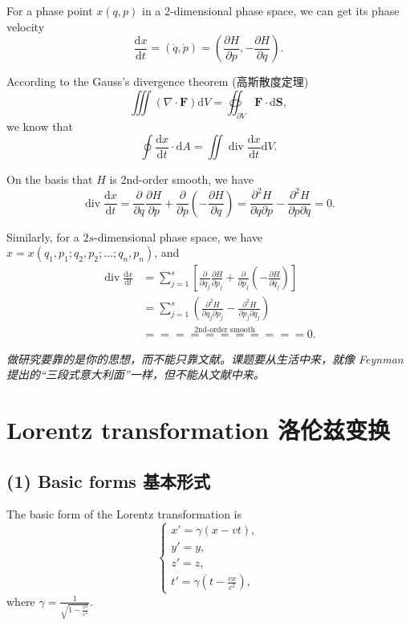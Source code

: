 For a phase point \(x(q, p)\) in a 2-dimensional phase space, we can get
its phase velocity
\[\frac{\mathrm{d}x}{\mathrm{d}t} = (\dot{q}, \dot{p}) = \left( \frac{\partial H}{\partial p}, - \frac{\partial H}{\partial q} \right).\]

According to the Gauss's divergence theorem (高斯散度定理)
\[\iiint (\nabla \cdot \boldsymbol{F}) \mathrm{d}V = \oiint_{\partial V} \boldsymbol{F} \cdot \mathrm{d} \boldsymbol{S},\]
we know that
\[\oint \frac{\mathrm{d}x}{\mathrm{d}t} \cdot \mathrm{d}A = \iint \operatorname{div} \frac{\mathrm{d}x}{\mathrm{d}t} \mathrm{d}V.\]

On the basis that \(H\) is 2nd-order smooth, we have
\[\operatorname{div} \frac{\mathrm{d}x}{\mathrm{d}t} = \frac{\partial}{\partial q} \frac{\partial H}{\partial p} + \frac{\partial}{\partial p} \left( - \frac{\partial H}{\partial q} \right) = \frac{\partial^2 H}{\partial q \partial p} - \frac{\partial^2 H}{\partial p \partial q} = 0.\]

Similarly, for a \(2s\)-dimensional phase space, we have
\(x = x(q_1, p_1; q_2, p_2; \dots; q_n, p_n)\), and \begin{align*}
    \operatorname{div} \frac{\mathrm{d}x}{\mathrm{d}t} & = \sum_{j = 1}^{s} \left[ \frac{\partial}{\partial q_j} \frac{\partial H}{\partial p_j} + \frac{\partial}{\partial p_j} \left( - \frac{\partial H}{\partial q_j} \right) \right] \\
    & = \sum_{j = 1}^{s} \left( \frac{\partial^2 H}{\partial q_j \partial p_j} - \frac{\partial^2 H}{\partial p_j \partial q_j} \right) \\
    & \overset{\text{2nd-order smooth}}{=\!=\!=\!=\!=\!=\!=\!=\!=\!=\!=} 0.
\end{align*}

\emph{做研究要靠的是你的思想，而不能只靠文献。课题要从生活中来，就像
Feynman 提出的``三段式意大利面''一样，但不能从文献中来。}

\section{Lorentz transformation
洛伦兹变换}\label{lorentz-transformation-ux6d1bux4f26ux5179ux53d8ux6362}

\subsection*{(1) Basic forms
基本形式}\label{basic-forms-ux57faux672cux5f62ux5f0f}

The basic form of the Lorentz transformation is \[\left\{
    \begin{array}{l}
        \displaystyle x' = \gamma \left( x - vt \right), \\
        \displaystyle y' = y, \\
        \displaystyle z' = z, \\
        \displaystyle t' = \gamma \left( t - \frac{vx}{c^2} \right),
    \end{array}
\right.\] where
\(\displaystyle \gamma=\frac{1}{\sqrt{1 - \displaystyle \frac{v^2}{c^2}}}\).

